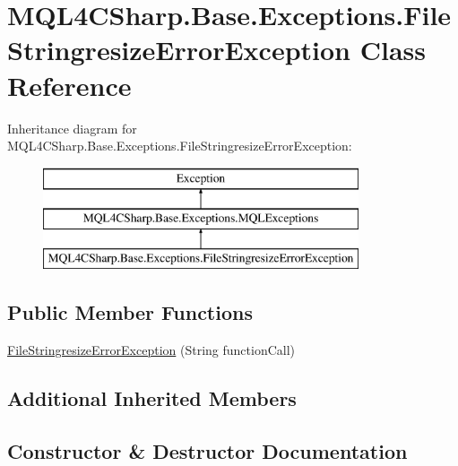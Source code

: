 \hypertarget{class_m_q_l4_c_sharp_1_1_base_1_1_exceptions_1_1_file_stringresize_error_exception}{}\section{M\+Q\+L4\+C\+Sharp.\+Base.\+Exceptions.\+File\+Stringresize\+Error\+Exception Class Reference}
\label{class_m_q_l4_c_sharp_1_1_base_1_1_exceptions_1_1_file_stringresize_error_exception}
Inheritance diagram for M\+Q\+L4\+C\+Sharp.\+Base.\+Exceptions.\+File\+Stringresize\+Error\+Exception\+:\begin{figure}[H]
\begin{center}
\leavevmode
\includegraphics[height=3.000000cm]{class_m_q_l4_c_sharp_1_1_base_1_1_exceptions_1_1_file_stringresize_error_exception}
\end{center}
\end{figure}
\subsection*{Public Member Functions}
\begin{DoxyCompactItemize}
\item 
\hyperlink{class_m_q_l4_c_sharp_1_1_base_1_1_exceptions_1_1_file_stringresize_error_exception_ae91c88fb770e6fa1087b3a3dd881b1ee}{File\+Stringresize\+Error\+Exception} (String function\+Call)
\end{DoxyCompactItemize}
\subsection*{Additional Inherited Members}


\subsection{Constructor \& Destructor Documentation}
